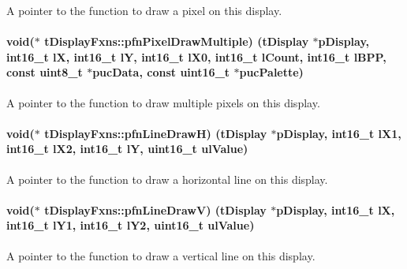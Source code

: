 A pointer to the function to draw a pixel on this display. 

\paragraph[{pfn\+Pixel\+Draw\+Multiple}]{\setlength{\rightskip}{0pt plus 5cm}void($\ast$ t\+Display\+Fxns\+::pfn\+Pixel\+Draw\+Multiple) ({\bf t\+Display} $\ast$p\+Display, int16\+\_\+t l\+X, int16\+\_\+t l\+Y, int16\+\_\+t l\+X0, int16\+\_\+t l\+Count, int16\+\_\+t l\+B\+P\+P, const uint8\+\_\+t $\ast$puc\+Data, const uint16\+\_\+t $\ast$puc\+Palette)}\label{structt_display_fxns_a95214d850a92705637a5d7d7a4d933fb}


A pointer to the function to draw multiple pixels on this display. 

\paragraph[{pfn\+Line\+Draw\+H}]{\setlength{\rightskip}{0pt plus 5cm}void($\ast$ t\+Display\+Fxns\+::pfn\+Line\+Draw\+H) ({\bf t\+Display} $\ast$p\+Display, int16\+\_\+t l\+X1, int16\+\_\+t l\+X2, int16\+\_\+t l\+Y, uint16\+\_\+t ul\+Value)}\label{structt_display_fxns_a154f087fd9eae1772c62016122bf3e05}


A pointer to the function to draw a horizontal line on this display. 

\paragraph[{pfn\+Line\+Draw\+V}]{\setlength{\rightskip}{0pt plus 5cm}void($\ast$ t\+Display\+Fxns\+::pfn\+Line\+Draw\+V) ({\bf t\+Display} $\ast$p\+Display, int16\+\_\+t l\+X, int16\+\_\+t l\+Y1, int16\+\_\+t l\+Y2, uint16\+\_\+t ul\+Value)}\label{structt_display_fxns_a5fff17e767fde1b95ec3334e3ce5c39d}


A pointer to the function to draw a vertical line on this display. 

